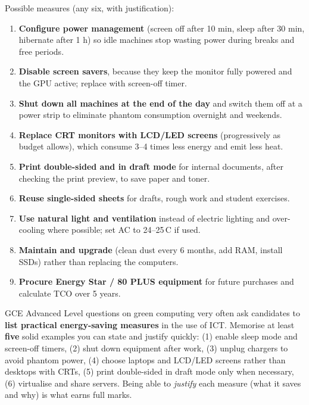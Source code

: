 \documentclass[11pt]{article}
\begin{document}
\begin{corrige}[Exercise 1]
Possible measures (any six, with justification):
\begin{enumerate}
\item \textbf{Configure power management} (screen off after 10 min, sleep after 30 min, hibernate after 1 h) so idle machines stop wasting power during breaks and free periods.
\item \textbf{Disable screen savers}, because they keep the monitor fully powered and the GPU active; replace with screen-off timer.
\item \textbf{Shut down all machines at the end of the day} and switch them off at a power strip to eliminate phantom consumption overnight and weekends.
\item \textbf{Replace CRT monitors with LCD/LED screens} (progressively as budget allows), which consume 3--4 times less energy and emit less heat.
\item \textbf{Print double-sided and in draft mode} for internal documents, after checking the print preview, to save paper and toner.
\item \textbf{Reuse single-sided sheets} for drafts, rough work and student exercises.
\item \textbf{Use natural light and ventilation} instead of electric lighting and over-cooling where possible; set AC to 24--25\,\textdegree C if used.
\item \textbf{Maintain and upgrade} (clean dust every 6 months, add RAM, install SSDs) rather than replacing the computers.
\item \textbf{Procure Energy Star / 80 PLUS equipment} for future purchases and calculate TCO over 5 years.
\end{enumerate}
\end{corrige}

\begin{savaistu}
GCE Advanced Level questions on green computing very often ask candidates to \textbf{list practical energy-saving measures} in the use of ICT. Memorise at least \textbf{five} solid examples you can state and justify quickly: (1) enable sleep mode and screen-off timers, (2) shut down equipment after work, (3) unplug chargers to avoid phantom power, (4) choose laptops and LCD/LED screens rather than desktops with CRTs, (5) print double-sided in draft mode only when necessary, (6) virtualise and share servers. Being able to \emph{justify} each measure (what it saves and why) is what earns full marks.
\end{savaistu}
\end{document}
